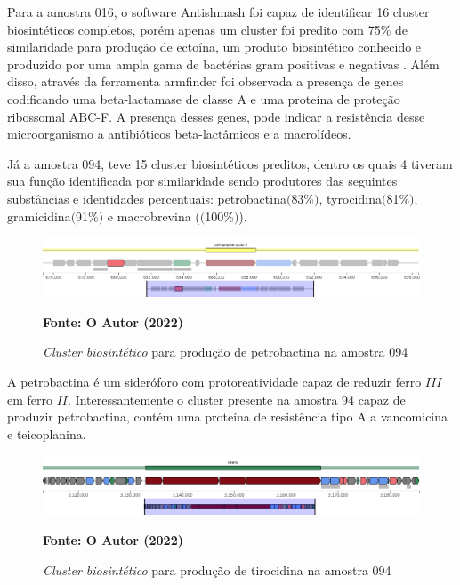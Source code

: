 Para a amostra 016, o software Antishmash foi capaz de identificar 16 cluster biosintéticos completos, porém
apenas um cluster foi predito com 75\% de similaridade para produção de ectoína, um produto biosintético
conhecido e produzido por uma ampla gama de bactérias gram positivas e negativas \cite{toveken2011specialized}.
Além disso, através da ferramenta armfinder foi observada a presença de genes codificando uma beta-lactamase de classe A e uma proteína de
proteção ribossomal ABC-F. A presença desses genes, pode indicar a resistência desse microorganismo a antibióticos beta-lactâmicos
e a macrolídeos.  

Já a amostra 094, teve 15 cluster biosintéticos preditos, dentro os quais 4 tiveram sua função identificada
por similaridade sendo produtores das seguintes substâncias e identidades percentuais: petrobactina$($83\%$)$, 
tyrocidina$($81\%$)$, gramicidina$($91\%$)$ e macrobrevina ($($100\%$)$). 


 \begin{figure}[H]
	\caption{\textit{Cluster biosintético} para produção de petrobactina na amostra 094}
	\label{fig:quast_16}
	\centering
		\includegraphics[width=0.8\linewidth]{imagens/antismash/094regiao1.png} \\
	\centering
    \begin{small}\textbf{Fonte: O Autor (2022)}\end{small}
\end{figure}
\vspace{\floatsep}

A petrobactina é um sideróforo com protoreatividade capaz de reduzir ferro $III$ em 
ferro $II$\cite{barbeau2002petrobactin}. Interessantemente o cluster presente na amostra 94
capaz de produzir petrobactina, contém uma proteína de resistência tipo A a vancomicina e teicoplanina.

\begin{figure}[H]
	\caption{\textit{Cluster biosintético} para produção de tirocidina na amostra 094}
	\label{fig:quast_16}
	\centering
		\includegraphics[width=0.8\linewidth]{imagens/antismash/094regiao2.png} \\
	\centering
    \begin{small}\textbf{Fonte: O Autor (2022)}\end{small}
\end{figure}
\vspace{\floatsep}

